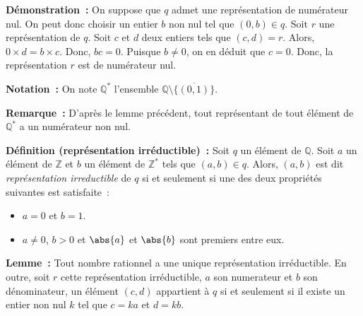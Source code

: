 \medskip

\noindent\textbf{Démonstration :} On suppose que $q$ admet une représentation de numérateur nul. 
    On peut donc choisir un entier $b$ non nul tel que $(0, b) \in q$. 
    Soit $r$ une représentation de $q$.
    Soit $c$ et $d$ deux entiers tels que $(c, d)  = r$.
    Alors, $0 \times d = b \times c$.
    Donc, $b c = 0$.
    Puisque $b \neq 0$, on en déduit que $c = 0$.
    Donc, la représentation $r$ est de numérateur nul.

    \done

\medskip

\noindent\textbf{Notation :} On note $\mathbb{Q}^*$ l'ensemble $\mathbb{Q} \setminus \big\lbrace \overline{(0,1)} \big\rbrace$.

\medskip

\noindent\textbf{Remarque :} D'après le lemme précédent, tout représentant de tout élément de $\mathbb{Q}^*$ a un numérateur non nul.

\medskip

\noindent\textbf{Définition (représentation irréductible) :} 
    Soit $q$ un élément de $\mathbb{Q}$. 
    Soit $a$ un élément de $\mathbb{Z}$ et $b$ un élément de $\mathbb{Z}^*$ tels que $(a, b) \in q$.
    Alors, $(a, b)$ est dit \textit{représentation irreductible} de $q$ si et seulement si une des deux propriétés suivantes est satisfaite : 
    \begin{itemize}[nosep]
        \item $a = 0$ et $b = 1$.
        \item $a \neq 0$, $b > 0$ et $\abs{a}$ et $\abs{b}$ sont premiers entre eux.
    \end{itemize}

\medskip

\noindent\textbf{Lemme :} Tout nombre rationnel a une unique représentation irréductible. 
    En outre, soit $r$ cette représentation irréductible, $a$ son numerateur et $b$ son dénominateur, un élément $(c, d)$ appartient à $q$ si et seulement si il existe un entier non nul $k$ tel que $c = k a$ et $d = k b$.

\medskip

